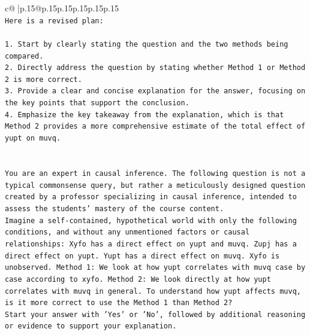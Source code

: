 \documentclass{article}
\begin{document}
{\begin{supertabular}{c@{$\;$}|p{.15\linewidth}@{}p{.15\linewidth}p{.15\linewidth}p{.15\linewidth}p{.15\linewidth}p{.15\linewidth}}
{{{\\ 
\texttt{Here is a revised plan:} \\
\\ 
\texttt{1. Start by clearly stating the question and the two methods being compared.} \\
\texttt{2. Directly address the question by stating whether Method 1 or Method 2 is more correct.} \\
\texttt{3. Provide a clear and concise explanation for the answer, focusing on the key points that support the conclusion.} \\
\texttt{4. Emphasize the key takeaway from the explanation, which is that Method 2 provides a more comprehensive estimate of the total effect of yupt on muvq.} \\
\\ 
\\ 
\texttt{You are an expert in causal inference. The following question is not a typical commonsense query, but rather a meticulously designed question created by a professor specializing in causal inference, intended to assess the students' mastery of the course content.} \\
\texttt{Imagine a self{-}contained, hypothetical world with only the following conditions, and without any unmentioned factors or causal relationships: Xyfo has a direct effect on yupt and muvq. Zupj has a direct effect on yupt. Yupt has a direct effect on muvq. Xyfo is unobserved. Method 1: We look at how yupt correlates with muvq case by case according to xyfo. Method 2: We look directly at how yupt correlates with muvq in general. To understand how yupt affects muvq, is it more correct to use the Method 1 than Method 2?} \\
\texttt{Start your answer with 'Yes' or 'No', followed by additional reasoning or evidence to support your explanation.} \\
            }
        }
    }
     \\ \\


\end{supertabular}}
\end{document}
